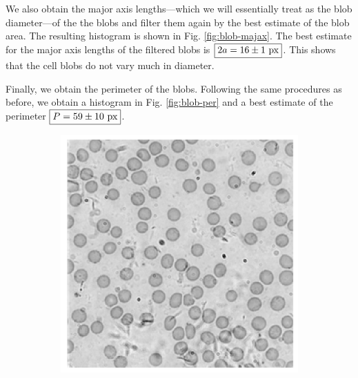 \documentclass[12pt,a4paper]{article}
\begin{document}
We also obtain the major axis lengths---which we will essentially treat as the blob diameter---of the the blobs and filter them again by the best estimate of the blob area. The resulting histogram is shown in Fig. \ref{fig:blob-majax}. The best estimate for the major axis lengths of the filtered blobs is $\boxed{2a = 16 \pm 1$ px$}$. This shows that the cell blobs do not vary much in diameter.

Finally, we obtain the perimeter of the blobs. Following the same procedures as before, we obtain a histogram in Fig. \ref{fig:blob-per} and a best estimate of the perimeter $\boxed{P = 59 \pm 10$ px$}$.

\begin{figure}[htb]
	\centering
	\begin{subfigure}[h!]{0.49\textwidth}
		\centering
		\includegraphics[width=\textwidth]{cell_gray.png}
		\caption{}
		\label{fig:cell-gray}
	\end{subfigure}
	\begin{subfigure}[h!]{0.49\textwidth}
		\centering

\end{subfigure}
\end{figure}
\end{document}
